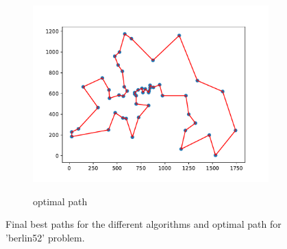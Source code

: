 \documentclass[12pt]{article}
\theoremstyle{plain}
\theoremstyle{definition}
\theoremstyle{remark}
\begin{document}
\begin{figure}[ht]
\begin{subfigure}{.5\textwidth}
		\includegraphics[scale = 0.44]{../../Implementation/gen/optimal_path_berlin52}
		\label{fig:optimal_path_berlin52}
		\caption{optimal path}
	\end{subfigure}
	\caption{Final best paths for the different algorithms and optimal path for 'berlin52' problem.}
	\label{fig:final_paths_berlin52}
\end{figure}
\newpage
\end{document}
